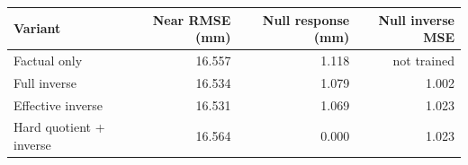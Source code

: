 \begin{tabular}{lrrr}
\toprule
Variant & Near RMSE (mm) & Null response (mm) & Null inverse MSE\\
\midrule
Factual only & 16.557 & 1.118 & not trained\\
Full inverse & 16.534 & 1.079 & 1.002\\
Effective inverse & 16.531 & 1.069 & 1.023\\
Hard quotient + inverse & 16.564 & 0.000 & 1.023\\
\bottomrule
\end{tabular}
